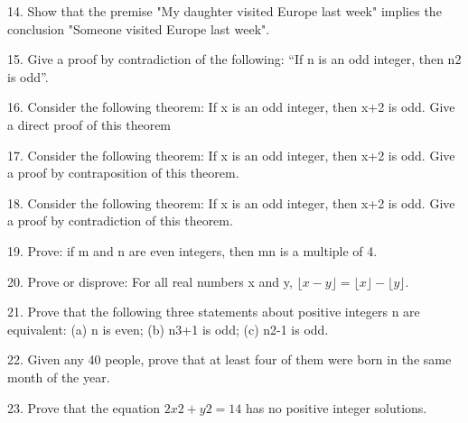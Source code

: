 \documentclass{article}
\begin{document}
14. Show that the premise "My daughter visited Europe last week" implies the conclusion "Someone visited Europe last week".

15. Give a proof by contradiction of the following: “If n is an odd integer, then n2 is odd”.

16. Consider the following theorem: If x is an odd integer, then x+2 is odd. Give a direct proof of this theorem

17. Consider the following theorem: If x is an odd integer, then x+2 is odd. Give a proof by contraposition of this theorem.

18. Consider the following theorem: If x is an odd integer, then x+2 is odd. Give a proof by contradiction of this theorem.

19. Prove: if m and n are even integers, then mn is a multiple of 4.

20. Prove or disprove: For all real numbers x and y, $\lfloor x-y\rfloor =\lfloor x \rfloor -\lfloor y \rfloor$.

21. Prove that the following three statements about positive integers n are equivalent: (a) n is even; (b) n3+1 is odd; (c) n2-1 is odd.

22. Given any 40 people, prove that at least four of them were born in the same month of the year.

23. Prove that the equation $2x2+y2=14$ has no positive integer solutions.
\end{document}
